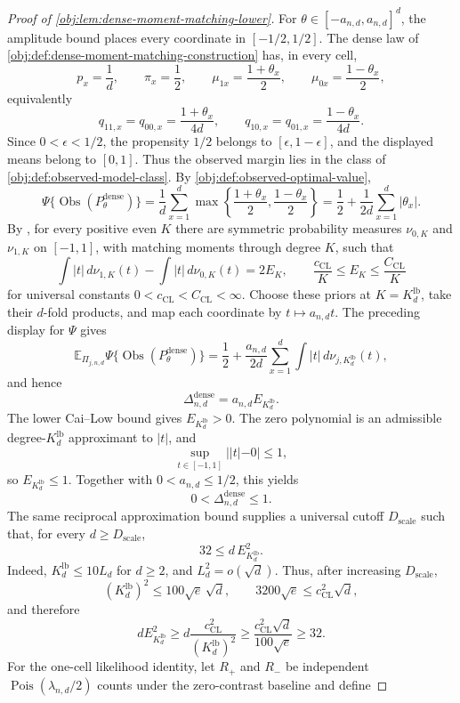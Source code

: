 \documentclass[11pt]{article}
\begin{document}
\begin{proof}[Proof of \cref{obj:lem:dense-moment-matching-lower}]
For \(\theta\in[-a_{n,d},a_{n,d}]^d\), the amplitude bound places every coordinate in \([-1/2,1/2]\). The dense law of \cref{obj:def:dense-moment-matching-construction} has, in every cell,
\[
p_x=\frac1d,\qquad
\pi_x=\frac12,\qquad
\mu_{1x}=\frac{1+\theta_x}{2},\qquad
\mu_{0x}=\frac{1-\theta_x}{2},
\]
equivalently
\[
q_{11,x}=q_{00,x}=\frac{1+\theta_x}{4d},
\qquad
q_{10,x}=q_{01,x}=\frac{1-\theta_x}{4d}.
\]
Since \(0<\epsilon<1/2\), the propensity \(1/2\) belongs to \([\epsilon,1-\epsilon]\), and the displayed means belong to \([0,1]\). Thus the observed margin lies in the class of \cref{obj:def:observed-model-class}. By \cref{obj:def:observed-optimal-value},
\[
\Psi\{\operatorname{Obs}(P_\theta^{\mathrm{dense}})\}
=
\frac1d\sum_{x=1}^d
\max\left\{\frac{1+\theta_x}{2},\frac{1-\theta_x}{2}\right\}
=
\frac12+\frac1{2d}\sum_{x=1}^d|\theta_x|.
\]
By \citep[Lemma 1 and Section 3.1]{CaiLow2011L1}, for every positive even \(K\) there are symmetric probability measures \(\nu_{0,K}\) and \(\nu_{1,K}\) on \([-1,1]\), with matching moments through degree \(K\), such that
\[
\int |t|\,d\nu_{1,K}(t)-\int |t|\,d\nu_{0,K}(t)=2E_K,
\qquad
\frac{c_{\mathrm{CL}}}{K}\le E_K\le \frac{C_{\mathrm{CL}}}{K}
\]
for universal constants \(0<c_{\mathrm{CL}}<C_{\mathrm{CL}}<\infty\). Choose these priors at \(K=K_d^{\mathrm{lb}}\), take their \(d\)-fold products, and map each coordinate by \(t\mapsto a_{n,d}t\). The preceding display for \(\Psi\) gives
\[
\mathbb E_{\Pi_{j,n,d}}\Psi\{\operatorname{Obs}(P_\theta^{\mathrm{dense}})\}
=
\frac12+\frac{a_{n,d}}{2d}
\sum_{x=1}^d\int |t|\,d\nu_{j,K_d^{\mathrm{lb}}}(t),
\]
and hence
\[
\Delta_{n,d}^{\mathrm{dense}}
=
a_{n,d}E_{K_d^{\mathrm{lb}}}.
\]
The lower Cai--Low bound gives \(E_{K_d^{\mathrm{lb}}}>0\). The zero polynomial is an admissible degree-\(K_d^{\mathrm{lb}}\) approximant to \(|t|\), and
\[
\sup_{t\in[-1,1]}||t|-0|\le1,
\]
so \(E_{K_d^{\mathrm{lb}}}\le1\). Together with \(0<a_{n,d}\le1/2\), this yields
\[
0<\Delta_{n,d}^{\mathrm{dense}}\le1.
\]
The same reciprocal approximation bound supplies a universal cutoff \(D_{\mathrm{scale}}\) such that, for every \(d\ge D_{\mathrm{scale}}\),
\[
32\le d\,E_{K_d^{\mathrm{lb}}}^{2}.
\]
Indeed, \(K_d^{\mathrm{lb}}\le10L_d\) for \(d\ge2\), and \(L_d^2=o(\sqrt d)\). Thus, after increasing \(D_{\mathrm{scale}}\),
\[
(K_d^{\mathrm{lb}})^2\le 100\sqrt e\,\sqrt d,
\qquad
3200\sqrt e\le c_{\mathrm{CL}}^2\sqrt d,
\]
and therefore
\[
dE_{K_d^{\mathrm{lb}}}^2
\ge
d\frac{c_{\mathrm{CL}}^2}{(K_d^{\mathrm{lb}})^2}
\ge
\frac{c_{\mathrm{CL}}^2\sqrt d}{100\sqrt e}
\ge32.
\]
For the one-cell likelihood identity, let \(R_+\) and \(R_-\) be independent \(\operatorname{Pois}(\lambda_{n,d}/2)\) counts under the zero-contrast baseline and define

\end{proof}
\end{document}
